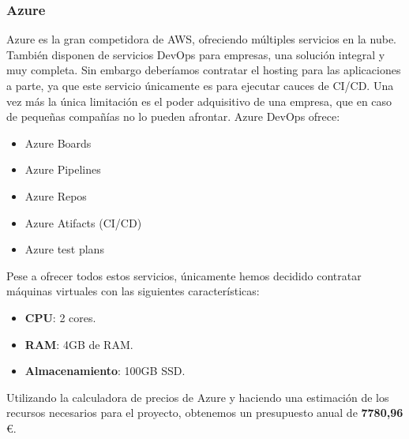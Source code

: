 		\subsubsection{Azure}
			\begin{text}
				Azure es la gran competidora de AWS, ofreciendo múltiples servicios en la nube. También disponen de servicios DevOps \cite{AzureDev63:online} para empresas, una solución integral y muy completa. Sin embargo deberíamos contratar el hosting para las aplicaciones a parte, ya que este servicio únicamente es para ejecutar cauces de CI/CD. Una vez más la única limitación es el poder adquisitivo de una empresa, que en caso de pequeñas compañías no lo pueden afrontar. Azure DevOps ofrece:
				\begin{itemize}
					\item Azure Boards
					\item Azure Pipelines
					\item Azure Repos
					\item Azure Atifacts (CI/CD)
					\item Azure test plans
				\end{itemize}
			
			Pese a ofrecer todos estos servicios, únicamente hemos decidido contratar máquinas virtuales con las siguientes características:
			
			\begin{itemize}
				\item \textbf{CPU}: 2 cores.
				\item \textbf{RAM}: 4GB de RAM.
				\item \textbf{Almacenamiento}: 100GB SSD.
			\end{itemize}
		
				Utilizando la calculadora de precios de Azure \cite{azurecalculadora:online} y haciendo una estimación de los recursos necesarios para el proyecto, obtenemos un presupuesto anual de \textbf{7780,96} \space \euro.
			\end{text}
	
		
